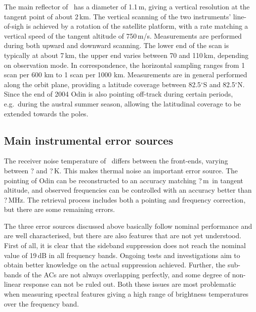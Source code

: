 The main reflector of \smr\ has a diameter of 1.1\,m, giving a
vertical resolution at the tangent point of about 2\,km. The vertical scanning
of the two instruments' line-of-sigh is achieved by a rotation of the satellite
platform, with a rate matching a vertical speed of the tangent altitude of
750\,m/s. Measurements are performed during both upward and downward scanning.
The lower end of the scan is typically at about 7\,km, the upper end varies
between 70 and 110\,km, depending on observation mode. In correspondence,
the horizontal sampling ranges from 1 scan per 600 km to 1 scan per 1000 km.
Measurements are in general performed along the orbit plane, providing a
latitude coverage between 82.5$^{\circ}$S and 82.5$^{\circ}$N. Since the end of
2004 Odin is also pointing off-track during certain periods, e.g.\ during the
austral summer season, allowing the latitudinal coverage to be extended towards
the poles. 


\subsection{Main instrumental error sources}
\label{sec:smr:errors}
%
The receiver noise temperature of \smr\ differs between the front-ends, varying
between ? and ?\,K. This makes thermal noise an important
error source. The pointing of Odin can be reconstructed to an accuracy matching
?\,m\ in tangent altitude, and observed frequencies can be
controlled with an accuracy better than ?\,MHz. The retrieval
process includes both a pointing and frequency correction, but there are some
remaining errors.

The three error sources discussed above basically follow nominal performance
and are well characterised, but there are also features that are not yet
understood. First of all, it is clear that the sideband suppression does not
reach the nominal value of 19\,dB in all frequency bands. Ongoing tests and
investigations aim to obtain better knowledge on the actual suppression achieved.
Further, the sub-bands of the ACs are not always overlapping perfectly, and
some degree of non-linear response can not be ruled out. Both these issues are
most problematic when measuring spectral features giving a high range of
brightness temperatures over the frequency band.

